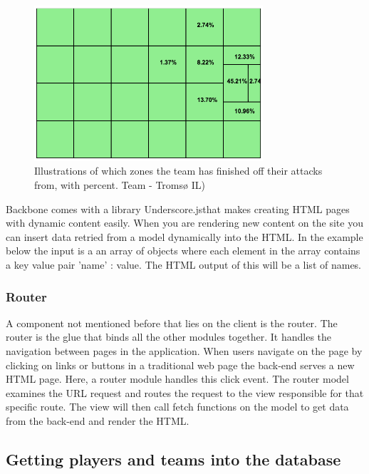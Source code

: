 \begin{figure}[ht!]
\centering
\includegraphics[width=85mm]{images/general/finishing_zones.png}
\caption{Illustrations of which zones the team has finished off their attacks from, with percent. Team - Tromsø IL)}
\label{fig:attacking_zones}
\end{figure}

Backbone comes with a library Underscore.js\footnotemark that makes creating HTML pages with dynamic content easily. When you are rendering new content on the site you can insert data retried from a model dynamically into the HTML. In the example below the input is a an array of objects where each element in the array contains a key value pair 'name' : value. The HTML output of this will be a list of names.




\subsubsection{Router}

A component not mentioned before that lies on the client is the router. The router is the glue that binds all the other modules together. It handles the navigation between pages in the application. When users navigate on the page by clicking on links or buttons in a traditional web page the back-end serves a new HTML page. Here, a router module handles this click event. The router model examines the URL request and routes the request to the view responsible for that specific route. The view will then call fetch functions on the model to get data from the back-end and render the HTML.

\subsection{Getting players and teams into the database}

